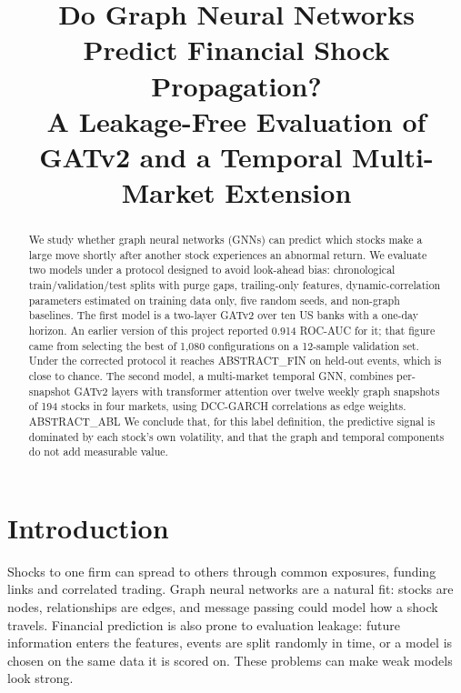 \documentclass[conference]{IEEEtran}
\begin{document}
\title{Do Graph Neural Networks Predict Financial Shock Propagation?\\
A Leakage-Free Evaluation of GATv2 and a Temporal Multi-Market Extension}

\author{
}

\maketitle

\begin{abstract}
We study whether graph neural networks (GNNs) can predict which stocks make a large move
shortly after another stock experiences an abnormal return. We evaluate two models under a
protocol designed to avoid look-ahead bias: chronological train/validation/test splits with
purge gaps, trailing-only features, dynamic-correlation parameters estimated on training
data only, five random seeds, and non-graph baselines. The first model is a two-layer GATv2
over ten US banks with a one-day horizon. An earlier version of this project reported
0.914 ROC-AUC for it; that figure came from selecting the best of 1,080 configurations on a
12-sample validation set. Under the corrected protocol it reaches ABSTRACT_FIN on held-out
events, which is close to chance. The second model, a multi-market temporal GNN, combines per-snapshot GATv2
layers with transformer attention over twelve weekly graph snapshots of 194 stocks in four
markets, using DCC-GARCH correlations as edge weights. ABSTRACT_ABL We conclude that, for
this label definition, the predictive signal is dominated by each stock's own volatility,
and that the graph and temporal components do not add measurable value.
\end{abstract}

\section{Introduction}
Shocks to one firm can spread to others through common exposures, funding links and
correlated trading. Graph neural networks are a natural fit: stocks are nodes,
relationships are edges, and message passing could model how a shock travels. Financial
prediction is also prone to evaluation leakage: future information enters the features,
events are split randomly in time, or a model is chosen on the same data it is scored on.
These problems can make weak models look strong.
\end{document}

